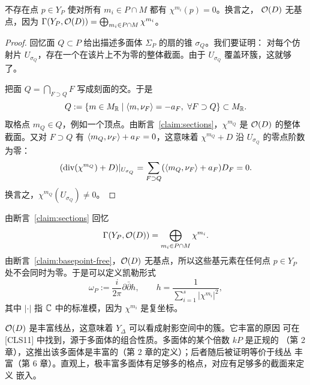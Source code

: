\begin{claim}[{无基点，[CLS11][Proposition 6.1.1]}]\label{claim:basepoint-free}
不存在点 $p\in Y_P$ 使对所有 $m_i\in P\cap M$ 都有 $\chi^{m_i}(p)=0$。换言之，
$\mathcal{O}(D)$ 无基点，因为
$\Gamma(Y_P,\mathcal{O}(D)) = \bigoplus_{m_i\in P\cap M}\chi^{m_i}$。
\end{claim}

\begin{proof}
回忆面 $Q\subset P$ 给出描述多面体 $\Sigma_P$ 的扇的锥 $\sigma_Q$。我们要证明：
对每个仿射片 $U_{\sigma_Q}$，存在一个在该片上不为零的整体截面。由于
$U_{\sigma_Q}$ 覆盖环簇，这就够了。

把面 $Q = \bigcap_{F\supset Q} F$ 写成刻面的交。于是
\[
Q := \{m\in M_{\mathbb{R}}\mid \langle m,\nu_F\rangle = -a_F,\ \forall F\supset Q\}\subset M_{\mathbb{R}}.
\]
取格点 $m_Q\in Q$，例如一个顶点。由断言~\ref{claim:sections}，$\chi^{m_Q}$ 是
$\mathcal{O}(D)$ 的整体截面。又对 $F\supset Q$ 有 $\langle m_Q,\nu_F\rangle+a_F=0$，这意味着
$\chi^{m_Q}+D$ 沿 $U_{\sigma_Q}$ 的零点阶数为零：
\[
(\operatorname{div}(\chi^{m_Q})+D)|_{U_{\sigma_Q}}
= \sum_{F\supset Q}(\langle m_Q,\nu_F\rangle+a_F)D_F = 0.
\]
换言之，$\chi^{m_Q}(U_{\sigma_Q})\ne 0$。
\end{proof}


\begin{corollary}[{辛形式的定义，[Huy05][Example 4.1.2]}]\label{cor:symplectic-form}
由断言~\ref{claim:sections} 回忆
\[
\Gamma(Y_P,\mathcal{O}(D)) = \bigoplus_{m_i\in P\cap M}\chi^{m_i}.
\]
由断言~\ref{claim:basepoint-free}，$\mathcal{O}(D)$ 无基点，所以这些基元素在任何点
$p\in Y_P$ 处不会同时为零。于是可以定义凯勒形式
\[
\omega_P := \frac{i}{2\pi}\partial\bar\partial h,\qquad
h = \frac{1}{\sum_{i=1}^s|\chi^{m_i}|^2},
\]
其中 $|\cdot|$ 指 $\mathbb{C}$ 中的标准模，因为 $\chi^{m_i}$ 是复坐标。
\end{corollary}


\begin{remark}
$\mathcal{O}(D)$ 是丰富线丛，这意味着 $Y_\Delta$ 可以看成射影空间中的簇。它丰富的原因
可在 [CLS11] 中找到，源于多面体的组合性质。多面体的某个倍数 $kP$ 是正规的
（第 2 章），这推出该多面体是丰富的（第 2 章的定义）；后者随后被证明等价于线丛
丰富（第 6 章）。直观上，极丰富多面体有足够多的格点，对应有足够多的截面来定义
嵌入。
\end{remark}
